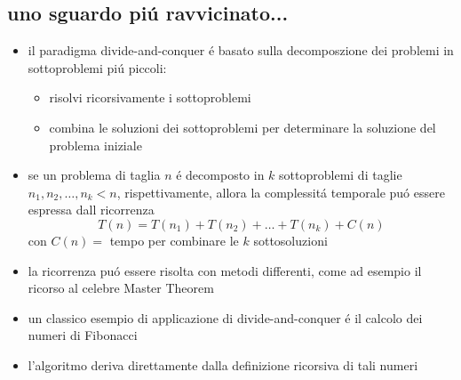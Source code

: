 \subsection*{uno sguardo pi\'u ravvicinato...}
\begin{flushleft}
	\begin{itemize}
		\item il paradigma divide-and-conquer \'e basato sulla decomposzione dei problemi in sottoproblemi pi\'u piccoli:
		\begin{itemize}
			\item risolvi ricorsivamente i sottoproblemi
			\item combina le soluzioni dei sottoproblemi per determinare la soluzione del problema iniziale
		\end{itemize}
		\item se un problema di taglia $n$ \'e decomposto in $k$ sottoproblemi di taglie $n_1,n_2,\ldots,n_k<n$, rispettivamente, allora la complessit\'a temporale pu\'o essere espressa dall ricorrenza
			$$T(n)=T(n_1)+T(n_2)+\ldots+T(n_k)+C(n)$$
		con $C(n)=$ tempo per combinare le $k$ sottosoluzioni
		\item la ricorrenza pu\'o essere risolta con metodi differenti, come ad esempio il ricorso al celebre Master Theorem
		\item un classico esempio di applicazione di divide-and-conquer \'e il calcolo dei numeri di Fibonacci
		\item l'algoritmo deriva direttamente dalla definizione ricorsiva di tali numeri
	\end{itemize}
\end{flushleft}


